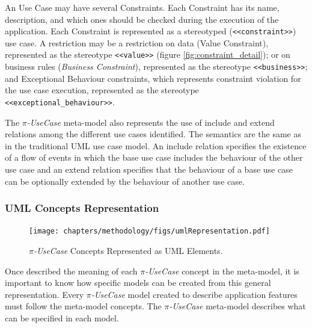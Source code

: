 An {\sc Use Case} may have several {\sc Constraints}. Each
{\sc Constraint} has its name, description, and which ones should be
checked during the execution of the application. Each {\sc Constraint} is
represented as a stereotyped (\texttt{<<constraint>>}) use case. A
restriction may be a restriction on data ({\sc Value Constraint}),
represented as the stereotype \texttt{<<value>>}  (figure
\ref{fig:constraint_detail}); or on business rules (\textit{Business Constraint}), represented as the stereotype
\texttt{<<business>>}; and {\sc Exceptional Behaviour} constraints, which
represents constraint violation for the use case execution, represented as the stereotype
\texttt{<<exceptional\_behaviour>>}. 

The \textit{$\pi$-UseCase} meta-model
also represents the use of include and extend relations among the different use
cases identified. The semantics are the same as in the traditional UML use case
model. An include relation specifies the existence of a flow of events in which
the base use case includes the behaviour of the other use case and an extend
relation specifies that the behaviour of a base use case can be optionally
extended by the behaviour of another use case.
 

 \subsubsection{UML Concepts Representation} 
  

\begin{figure}[ht!]
\centering
\texttt{[image: chapters/methodology/figs/umlRepresentation.pdf]}
\caption{\textit{$\pi$-UseCase} Concepts Represented as UML Elements.}
\label{fig:umlrepresentation}
\end{figure}

Once described the meaning of each \textit{$\pi$-UseCase} concept in the
meta-model, it is important to know how specific models can be
created from this general representation. Every \textit{$\pi$-UseCase} model
created to describe application features must follow the
meta-model concepts. The \textit{$\pi$-UseCase} meta-model describes what can be
specified in each model.

